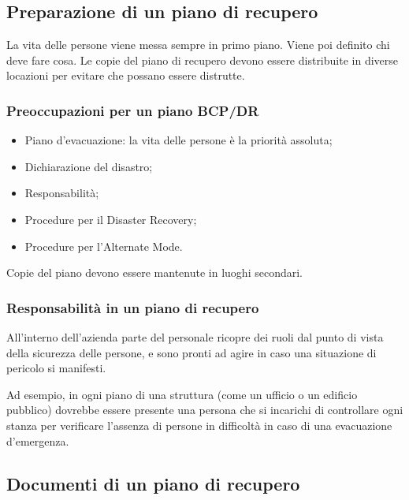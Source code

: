 \subsection{Preparazione di un piano di recupero}

La vita delle persone viene messa sempre in primo piano. Viene poi definito chi
deve fare cosa. Le copie del piano di recupero devono essere distribuite in
diverse locazioni per evitare che possano essere distrutte.

\subsubsection{Preoccupazioni per un piano BCP/DR}

\begin{itemize}
\item Piano d'evacuazione: la vita delle persone è la priorità assoluta;
\item Dichiarazione del disastro;
\item Responsabilità;
\item Procedure per il Disaster Recovery;
\item Procedure per l'Alternate Mode.
\end{itemize}

Copie del piano devono essere mantenute in luoghi secondari.

\subsubsection{Responsabilità in un piano di recupero}

All'interno dell'azienda parte del personale ricopre dei ruoli dal punto di
vista della sicurezza delle persone, e sono pronti ad agire in caso una
situazione di pericolo si manifesti.

Ad esempio, in ogni piano di una struttura (come un ufficio o un edificio
pubblico) dovrebbe essere presente una persona che si incarichi di controllare
ogni stanza per verificare l'assenza di persone in difficoltà in caso di una
evacuazione d'emergenza.

\subsection{Documenti di un piano di recupero}

